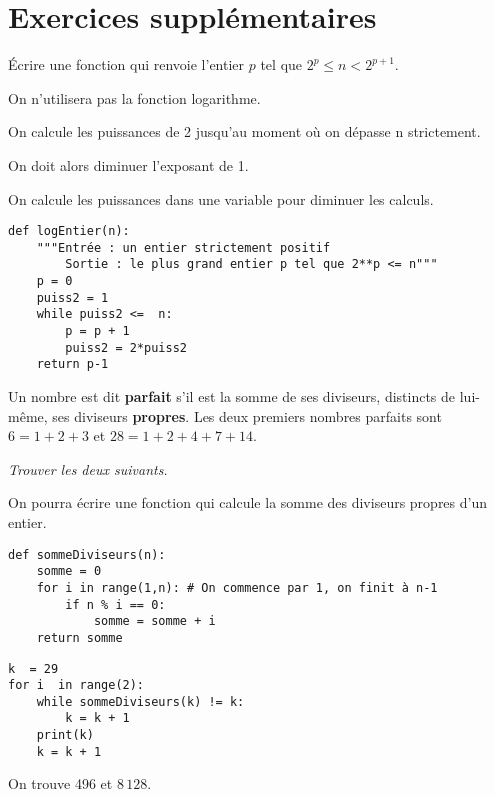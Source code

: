 \section{Exercices supplémentaires} 
\begin{Exercise}[title= Logarithme entier]
Écrire une fonction  qui renvoie l'entier $p$ tel que $2^p \le n < 2^{p+1}$. 

On n'utilisera pas la fonction logarithme.
\end{Exercise}
\begin{Answer}

On calcule les puissances de 2 jusqu'au moment où on dépasse n strictement.

On doit alors diminuer l'exposant de 1.

On calcule les puissances dans une variable pour diminuer les calculs.
\begin{lstlisting}
def logEntier(n):
    """Entrée : un entier strictement positif
        Sortie : le plus grand entier p tel que 2**p <= n"""
    p = 0
    puiss2 = 1
    while puiss2 <=  n:
        p = p + 1
        puiss2 = 2*puiss2
    return p-1 
\end{lstlisting}
\end{Answer}
Un nombre est dit {\bf parfait} s'il est la somme de ses diviseurs, distincts de lui-même, ses diviseurs {\bf propres}. 
Les deux premiers nombres parfaits sont $6=1+2+3$ et $28 = 1+2+4+7+14$.
\begin{Exercise}[title= Nombres parfaits]\it
Trouver les deux suivants.

On pourra écrire une fonction qui calcule la somme des diviseurs propres d'un entier.
\end{Exercise}
\begin{Answer}
\begin{lstlisting}
def sommeDiviseurs(n):
    somme = 0
    for i in range(1,n): # On commence par 1, on finit à n-1
        if n % i == 0:
            somme = somme + i
    return somme
\end{lstlisting}

\begin{lstlisting}
k  = 29
for i  in range(2):
    while sommeDiviseurs(k) != k:
        k = k + 1
    print(k)
    k = k + 1
\end{lstlisting}
On trouve 496 et $8\,128$.
\end{Answer}
